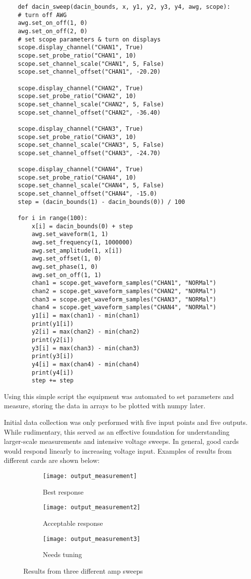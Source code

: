 \begin{lstlisting}
	def dacin_sweep(dacin_bounds, x, y1, y2, y3, y4, awg, scope):
    # turn off AWG
    awg.set_on_off(1, 0)
    awg.set_on_off(2, 0)
    # set scope parameters & turn on displays
    scope.display_channel("CHAN1", True)
    scope.set_probe_ratio("CHAN1", 10)
    scope.set_channel_scale("CHAN1", 5, False)
    scope.set_channel_offset("CHAN1", -20.20)

    scope.display_channel("CHAN2", True)
    scope.set_probe_ratio("CHAN2", 10)
    scope.set_channel_scale("CHAN2", 5, False)
    scope.set_channel_offset("CHAN2", -36.40)

    scope.display_channel("CHAN3", True)
    scope.set_probe_ratio("CHAN3", 10)
    scope.set_channel_scale("CHAN3", 5, False)
    scope.set_channel_offset("CHAN3", -24.70)

    scope.display_channel("CHAN4", True)
    scope.set_probe_ratio("CHAN4", 10)
    scope.set_channel_scale("CHAN4", 5, False)
    scope.set_channel_offset("CHAN4", -15.0)
    step = (dacin_bounds(1) - dacin_bounds(0)) / 100

    for i in range(100):
        x[i] = dacin_bounds(0) + step
        awg.set_waveform(1, 1)
        awg.set_frequency(1, 1000000)
        awg.set_amplitude(1, x[i])
        awg.set_offset(1, 0)
        awg.set_phase(1, 0)
        awg.set_on_off(1, 1)
        chan1 = scope.get_waveform_samples("CHAN1", "NORMal")
        chan2 = scope.get_waveform_samples("CHAN2", "NORMal")
        chan3 = scope.get_waveform_samples("CHAN3", "NORMal")
        chan4 = scope.get_waveform_samples("CHAN4", "NORMal")
        y1[i] = max(chan1) - min(chan1)
        print(y1[i])
        y2[i] = max(chan2) - min(chan2)
        print(y2[i])
        y3[i] = max(chan3) - min(chan3)
        print(y3[i])
        y4[i] = max(chan4) - min(chan4)
        print(y4[i])
        step += step
\end{lstlisting}
\FloatBarrier
Using this simple script the equipment was automated to set parameters and measure, storing the data in arrays to be plotted with numpy later. \par
Initial data collection was only performed with five input points and five outputs. While rudimentary, this served as an effective foundation for understanding larger-scale measurements and intensive voltage sweeps. In general, good cards would respond linearly to increasing voltage input. Examples of results from different cards are shown below:
\begin{figure}[!htb]
	\centering
	\begin{subfigure}[b]{0.4\textwidth}
		\texttt{[image: output\_measurement]}
		\caption{Best response}
	\end{subfigure}
	\begin{subfigure}[b]{0.4\textwidth}
		\texttt{[image: output\_measurement2]}
		\caption{Acceptable response}
		\label{graphb}
	\end{subfigure}
	\begin{subfigure}[b]{0.4\textwidth}
		\texttt{[image: output\_measurement3]}
		\caption{Needs tuning}
	\end{subfigure}
	\caption{Results from three different amp sweeps}
\end{figure}
